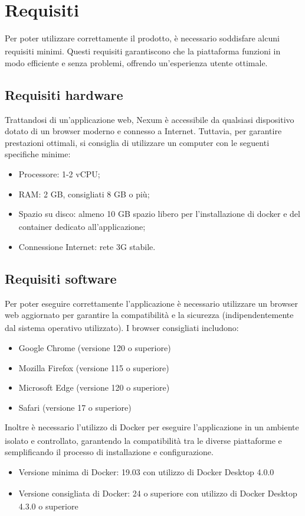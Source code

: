 \documentclass[a4paper,11pt]{article}
\newcommand{\G}{\textsubscript{\scalebox{0.6}{\textbf{G}}}}
\begin{document}
\newpage

\section{Requisiti}
Per poter utilizzare correttamente il prodotto\G{}, è necessario soddisfare alcuni requisiti minimi. 
Questi requisiti garantiscono che la piattaforma funzioni in modo efficiente e senza problemi, offrendo un'esperienza utente ottimale.


\subsection{Requisiti hardware}
Trattandosi di un'applicazione web, Nexum è accessibile da qualsiasi dispositivo dotato di un browser moderno e connesso a Internet.
Tuttavia, per garantire prestazioni ottimali, si consiglia di utilizzare un computer con le seguenti specifiche minime:
\begin{itemize}
    \item Processore: 1-2 vCPU;
    \item RAM: 2 GB, consigliati 8 GB o più;
    \item Spazio su disco: almeno 10 GB spazio libero per l'installazione di docker\G{} e del container dedicato all'applicazione;
    \item Connessione Internet: rete 3G stabile.
\end{itemize}


\subsection{Requisiti software}
Per poter eseguire correttamente l'applicazione è necessario utilizzare un browser web aggiornato per garantire la compatibilità e la sicurezza\G{} (indipendentemente dal sistema operativo utilizzato).
I browser consigliati includono:
\begin{itemize}
    \item Google Chrome (versione 120 o superiore)
    \item Mozilla Firefox (versione 115 o superiore)
    \item Microsoft Edge (versione 120 o superiore)
    \item Safari (versione 17 o superiore)
\end{itemize}

Inoltre è necessario l'utilizzo di Docker\G{} per eseguire l'applicazione in un ambiente isolato e controllato, garantendo la compatibilità tra le diverse piattaforme e semplificando il processo di installazione e configurazione.
\begin{itemize}
    \item Versione minima di Docker\G{}: 19.03 con utilizzo di Docker\G{} Desktop 4.0.0
    \item Versione consigliata di Docker\G{}: 24 o superiore con utilizzo di Docker\G{} Desktop 4.3.0 o superiore
\end{itemize}
\end{document}
